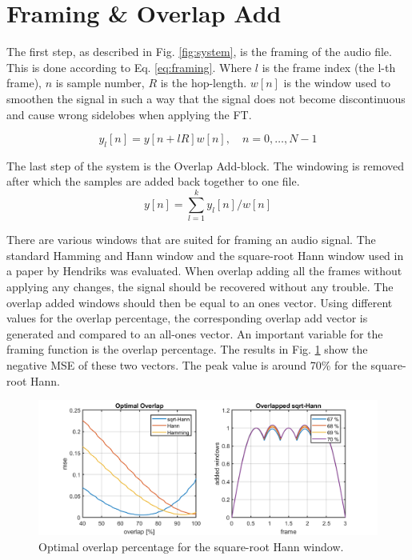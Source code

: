 \section{Framing \& Overlap Add} \label{sec:framing_overlap_add}

The first step, as described in Fig. \ref{fig:system}, is the framing of the audio file. This is done according to Eq. \ref{eq:framing}. Where $l$ is the frame index (the l-th frame), $n$ is sample number, $R$ is the hop-length. $w[n]$ is the window used to smoothen the signal in such a way that the signal does not become discontinuous and cause wrong sidelobes when applying the FT.

\begin{equation}
  \label{eq:framing}
  y_{l}[n] = y[n + lR]w[n],\quad n=0,\hdots,N-1
\end{equation}

The last step of the system is the Overlap Add-block. The windowing is removed after which the samples are added back together to one file.
\begin{equation}
  \label{eq:overlap_add}
  y[n] =  \sum_{l=1}^{k} y_{l}[n]/w[n]
\end{equation}

There are various windows that are suited for framing an audio signal. The standard Hamming and Hann window and the square-root Hann window used in a paper by Hendriks\cite{Hendriks} was evaluated. When overlap adding all the frames without applying any changes, the signal should be recovered without any trouble. The overlap added windows should then be equal to an ones vector. Using different values for the overlap percentage, the corresponding overlap add vector is generated and compared to an all-ones vector. An important variable for the framing function is the overlap percentage.  The results in Fig. \ref{fig:opt_oa} show the negative MSE of these two vectors. The peak value is around 70\% for the square-root Hann.

\begin{figure}[h]
  \includegraphics[width=\textwidth]{images/optimal_overlap.png}
  \caption{Optimal overlap percentage for the square-root Hann window.}
  \label{fig:opt_oa}
\end{figure}
